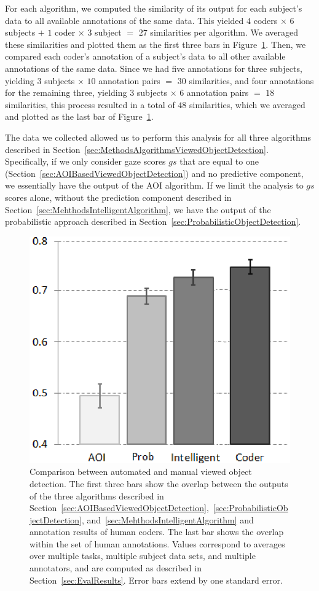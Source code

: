 For each algorithm, we computed the similarity of its output for each subject's data to all available annotations of the same data.  This yielded $4$ coders $\times$ $6$ subjects $+$  $1$ coder $\times$ $3$ subject $=$ $27$ similarities per algorithm. We averaged these similarities and plotted them as the first three bars in Figure~\ref{fig:quantitative}. Then, we compared each coder's annotation of a subject's data to all other available annotations of the same data. Since we had five annotations for three subjects, yielding $3$ subjects $\times$ $10$ annotation pairs $=$ $30$ similarities, and four annotations for the remaining three, yielding $3$ subjects $\times$ $6$ annotation pairs $=$ $18$ similarities, this process resulted in a total of $48$ similarities, which we averaged and plotted as the last bar of Figure~\ref{fig:quantitative}.

The data we collected allowed us to perform this analysis for all three algorithms described in Section~\ref{sec:MethodsAlgorithmsViewedObjectDetection}. Specifically, if we only consider gaze scores $gs$ that are equal to one (Section~\ref{sec:AOIBasedViewedObjectDetection}) and no predictive component, we essentially have the output of the AOI algorithm. If we limit the analysis to $gs$ scores alone, without the prediction component described in Section~\ref{sec:MehthodsIntelligentAlgorithm}, we have the output of the probabilistic approach described in Section~\ref{sec:ProbabilisticObjectDetection}.

\begin{figure}[htb]
  \centering
  \includegraphics[width=0.6\linewidth]{images/algosComparison.eps}
  \caption{Comparison between automated and manual viewed object detection.
The first three bars show the overlap between the outputs of
the three algorithms described in Section~\ref{sec:AOIBasedViewedObjectDetection},~\ref{sec:ProbabilisticObjectDetection}, and~\ref{sec:MehthodsIntelligentAlgorithm} and
annotation results of human coders. The last bar shows the overlap
within the set of human annotations. Values correspond to averages
over multiple tasks, multiple subject data sets, and multiple annotators,
and are computed as described in Section~\ref{sec:EvalResults}. Error bars
extend by one standard error. }
	\label{fig:quantitative}
\end{figure}

